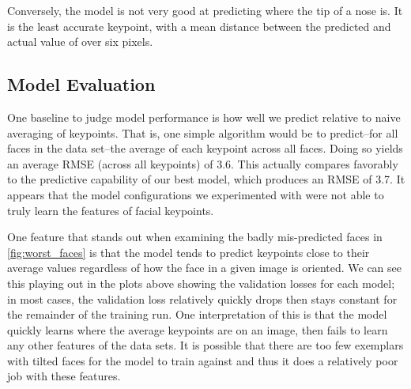 \documentclass[journal]{IEEEtran}
\begin{document}
Conversely, the model is not very good at predicting where the tip of a nose is. It is the least accurate keypoint, with a mean distance between the predicted and actual value of over six pixels.




\subsection{Model Evaluation}

One baseline to judge model performance is how well we predict relative to naive averaging of keypoints. That is, one simple algorithm would be to predict--for all faces in the data set--the average of each keypoint across all faces. Doing so yields an average RMSE (across all keypoints) of 3.6. This actually compares favorably to the predictive capability of our best model, which produces an RMSE of 3.7. It appears that the model configurations we experimented with were not able to truly learn the features of facial keypoints. 

One feature that stands out when examining the badly mis-predicted faces in \cref{fig:worst_faces} is that the model tends to predict keypoints close to their average values regardless of how the face in a given image is oriented. We can see this playing out in the plots above showing the validation losses for each model; in most cases, the validation loss relatively quickly drops then stays constant for the remainder of the training run. One interpretation of this is that the model quickly learns where the average keypoints are on an image, then fails to learn any other features of the data sets. It is possible that there are too few exemplars with tilted faces for the model to train against and thus it does a relatively poor job with these features.
\end{document}
